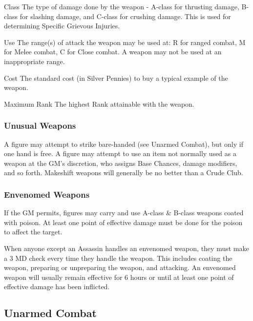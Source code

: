 \begin{multicols*}{3}
\begin{Description}
\item[Class] The type of damage done by the weapon - A-class for
thrusting damage, B-class for slashing damage, and C-class for
crushing damage. This is used for determining Specific Grievous
Injuries.

\item[Use] The range(s) of attack the weapon may be used at: R for
ranged combat, M for Melee combat, C for Close combat. A weapon may
not be used at an inappropriate range.

\item[Cost] The standard cost (in Silver Pennies) to buy a typical
example of the weapon.

\item[Maximum Rank] The highest Rank attainable with the weapon.

\end{Description}

\subsubsection{Unusual Weapons}

A figure may attempt to strike bare-handed (see Unarmed Combat), but
only if one hand is free. A figure may attempt to use an item not
normally used as a weapon at the GM's discretion, who assigns Base
Chances, damage modifiers, and so forth. Makeshift weapons will
generally be no better than a Crude Club.

\subsubsection{Envenomed Weapons}

If the GM permits, figures may carry and use A-class \& B-class
weapons coated with poison. At least one point of effective damage
must be done for the poison to affect the target.

When anyone except an Assassin handles an envenomed weapon, they must
make a 3 \x MD check every time they handle the weapon. This includes
coating the weapon, preparing or unpreparing the weapon, and
attacking. An envenomed weapon will usually remain effective for 6
hours or until at least one point of effective damage has been
inflicted.

\subsection{Unarmed Combat}
\label{combat:unarmed}


\end{multicols*}
